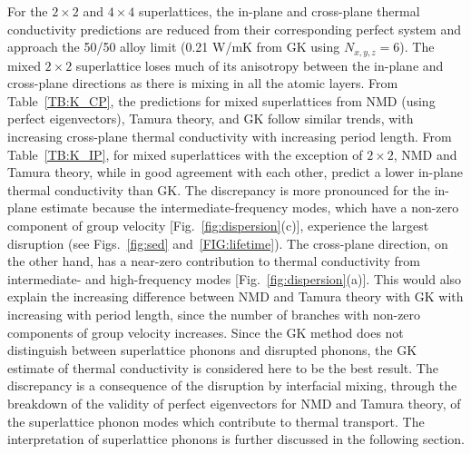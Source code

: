 \documentclass[aps,prb,preprint,preprintnumbers,amsmath,amssymb,floatfix,superscriptaddress]{revtex4}
\begin{document}
For the $2\times 2$ and $4\times 4$ superlattices, the in-plane and cross-plane thermal conductivity predictions are reduced from their corresponding perfect system and approach the 50/50 alloy limit (0.21 W/mK from GK using $N_{x,y,z}=6$). The mixed $2\times 2$ superlattice loses much of its anisotropy between the in-plane and cross-plane directions as there is mixing in all the atomic layers. From Table~\ref{TB:K_CP}, the predictions for mixed superlattices from NMD (using perfect eigenvectors), Tamura theory, and GK follow similar trends, with increasing cross-plane thermal conductivity with increasing period length. From Table~\ref{TB:K_IP}, for mixed superlattices with the exception of $2 \times 2$, NMD and Tamura theory, while in good agreement with each other, predict a lower in-plane thermal conductivity than GK. The discrepancy is more pronounced for the in-plane estimate because the intermediate-frequency modes, which have a non-zero component of group velocity [Fig.~\ref{fig:dispersion}(c)], experience the largest disruption (see Figs.~\ref{fig:sed} and~\ref{FIG:lifetime}). The cross-plane direction, on the other hand, has a near-zero contribution to thermal conductivity from intermediate- and high-frequency modes [Fig.~\ref{fig:dispersion}(a)]. This would also explain the increasing difference between NMD and Tamura theory with GK with increasing with period length, since the number of branches with non-zero components of group velocity increases. Since the GK method does not distinguish between superlattice phonons and disrupted phonons, the GK estimate of thermal conductivity is considered here to be the best result. The discrepancy is a consequence of the disruption by interfacial mixing, through the breakdown of the validity of perfect eigenvectors for NMD and Tamura theory, of the superlattice phonon modes which contribute to thermal transport. The interpretation of superlattice phonons is further discussed in the following section.
\end{document}

